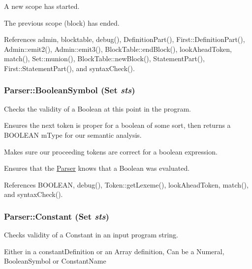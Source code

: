 A new scope has started.

The previous scope (block) has ended. 



References admin, blocktable, debug(), DefinitionPart(), First::DefinitionPart(), Admin::emit2(), Admin::emit3(), BlockTable::endBlock(), lookAheadToken, match(), Set::munion(), BlockTable::newBlock(), StatementPart(), First::StatementPart(), and syntaxCheck().

\hypertarget{classParser_abe1306c1c2cd82d3d690c42d0aef228f}{
\subsubsection[{BooleanSymbol}]{ Parser::BooleanSymbol ({\bf Set} {\em sts})}}
\label{classParser_abe1306c1c2cd82d3d690c42d0aef228f}


Checks the validity of a Boolean at this point in the program. 

Ensures the next token is proper for a boolean of some sort, then returns a BOOLEAN mType for our semantic analysis. 

Makes sure our proceeding tokens are correct for a boolean expression.

Ensures that the \hyperlink{classParser}{Parser} knows that a Boolean was evaluated. 



References BOOLEAN, debug(), Token::getLexeme(), lookAheadToken, match(), and syntaxCheck().

\hypertarget{classParser_af12c5409d708918579a425a44db62fd2}{
\subsubsection[{Constant}]{ Parser::Constant ({\bf Set} {\em sts})}}
\label{classParser_af12c5409d708918579a425a44db62fd2}


Checks validity of a Constant in an input program string. 

Either in a constantDefinition or an Array definition, Can be a Numeral, BooleanSymbol or ConstantName

